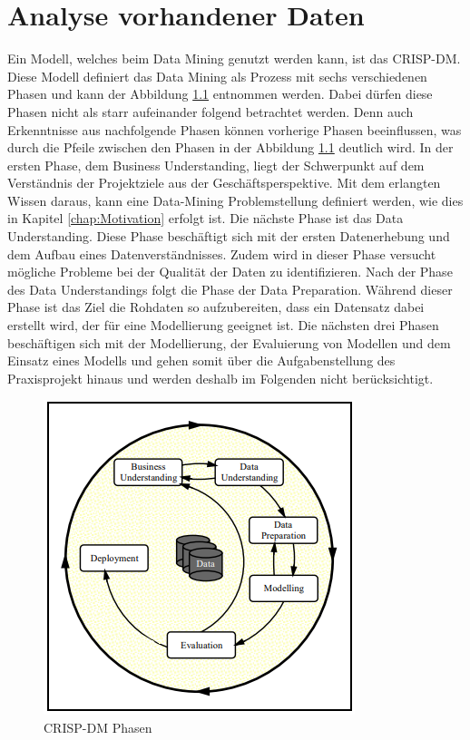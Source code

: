 \chapter{Analyse vorhandener Daten}
\label{chap:kapitel4}

Ein Modell, welches beim Data Mining genutzt werden kann, ist das \ac*{CRISP-DM}. Diese Modell definiert das Data Mining als Prozess mit sechs verschiedenen Phasen und kann der 
Abbildung \ref*{fig:CRISP-DM} entnommen werden. Dabei dürfen diese Phasen nicht als starr aufeinander folgend betrachtet werden. Denn auch Erkenntnisse aus nachfolgende Phasen können vorherige Phasen
beeinflussen, was durch die Pfeile zwischen den Phasen in der Abbildung \ref*{fig:CRISP-DM} deutlich wird. In der ersten Phase, dem Business Understanding, liegt der Schwerpunkt auf dem Verständnis 
der Projektziele aus der Geschäftsperspektive. Mit dem erlangten Wissen daraus, kann eine Data-Mining Problemstellung definiert werden, wie dies in Kapitel \ref*{chap:Motivation} erfolgt ist. 
Die nächste Phase ist das Data Understanding. Diese Phase beschäftigt sich mit der ersten Datenerhebung und dem Aufbau eines Datenverständnisses. Zudem wird in dieser Phase versucht mögliche Probleme 
bei der Qualität der Daten zu identifizieren. Nach der Phase des Data Understandings folgt die Phase der Data Preparation. Während dieser Phase ist das Ziel die Rohdaten so aufzubereiten, dass ein 
Datensatz dabei erstellt wird, der für eine Modellierung geeignet ist. Die nächsten drei Phasen beschäftigen sich mit der Modellierung, der Evaluierung von Modellen und dem Einsatz 
eines Modells und gehen somit über die Aufgabenstellung des Praxisprojekt hinaus und werden deshalb im Folgenden nicht berücksichtigt. \cite[S.5-7]{q8}

\begin{figure}[H]
    \centering
    \includegraphics[]{abbildungen/CrispDM.PNG}
    \caption{\acs{CRISP-DM} Phasen \cite[S.5]{q8}}
    \label{fig:CRISP-DM}
\end{figure}

